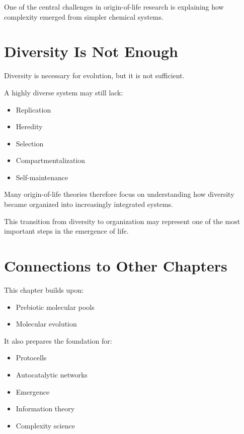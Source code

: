 \documentclass[
  oneside,
  openany]{book}
\providecommand{\tightlist}{%
  \setlength{\itemsep}{0pt}\setlength{\parskip}{0pt}}
\begin{document}
One of the central challenges in origin-of-life research is explaining how complexity emerged from simpler chemical systems.

\section{Diversity Is Not Enough}\label{diversity-is-not-enough}

Diversity is necessary for evolution, but it is not sufficient.

A highly diverse system may still lack:

\begin{itemize}
\tightlist
\item
  Replication
\item
  Heredity
\item
  Selection
\item
  Compartmentalization
\item
  Self-maintenance
\end{itemize}

Many origin-of-life theories therefore focus on understanding how diversity became organized into increasingly integrated systems.

This transition from diversity to organization may represent one of the most important steps in the emergence of life.

\section{Connections to Other Chapters}\label{connections-to-other-chapters}

This chapter builds upon:

\begin{itemize}
\tightlist
\item
  Prebiotic molecular pools
\item
  Molecular evolution
\end{itemize}

It also prepares the foundation for:

\begin{itemize}
\tightlist
\item
  Protocells
\item
  Autocatalytic networks
\item
  Emergence
\item
  Information theory
\item
  Complexity science
\end{itemize}
\end{document}
